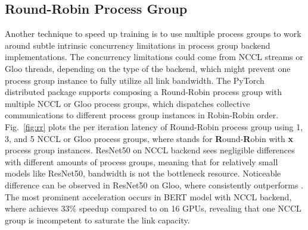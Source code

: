 \subsection{Round-Robin Process Group}





Another technique to speed up training is to use multiple process groups to work around subtle intrinsic concurrency limitations in process group backend implementations. The concurrency limitations could come from NCCL streams or Gloo threads, depending on the type of the backend, which might prevent one process group instance to fully utilize all link bandwidth. The PyTorch distributed package supports composing a Round-Robin process group with multiple NCCL or Gloo process groups, which dispatches collective communications to different process group instances in Robin-Robin order. Fig.~\ref{fig:rr} plots the per iteration latency of Round-Robin process group using 1, 3, and 5 NCCL or Gloo process groups, where  stands for \textbf{R}ound-\textbf{R}obin with \textbf{x} process group instances. ResNet50 on NCCL backend sees negligible differences with different amounts of process groups, meaning that for relatively small models like ResNet50, bandwidth is not the bottleneck resource. Noticeable difference can be observed in ResNet50 on Gloo, where  consistently outperforms . The most prominent acceleration occurs in BERT model with NCCL backend, where  achieves 33\% speedup compared to  on 16 GPUs, revealing that one NCCL group is incompetent to saturate the link capacity.

